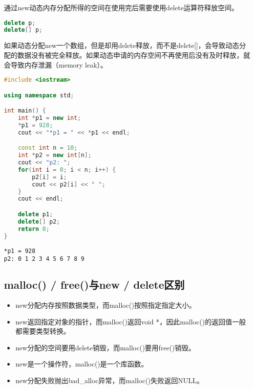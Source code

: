通过new动态内存分配所得的空间在使用完后需要使用delete运算符释放空间。

\vspace{-0.5cm}

\begin{lstlisting}[language=C++]
delete p;
delete[] p;
\end{lstlisting}

如果动态分配new一个数组，但是却用delete释放，而不是delete[]，会导致动态分配的数据没有被完全释放。如果动态申请的内存空间不再使用后没有及时释放，就会导致内存泄漏（memory leak）。 \\


\begin{lstlisting}[language=C++]
#include <iostream>

using namespace std;

int main() {
    int *p1 = new int;
    *p1 = 928;
    cout << "*p1 = " << *p1 << endl;

    const int n = 10;
    int *p2 = new int[n];
    cout << "p2: ";
    for(int i = 0; i < n; i++) {
        p2[i] = i;
        cout << p2[i] << " ";
    }
    cout << endl;

    delete p1;
    delete[] p2;
    return 0;
}
\end{lstlisting}

\begin{tcolorbox}
	\begin{verbatim}
*p1 = 928
p2: 0 1 2 3 4 5 6 7 8 9
	\end{verbatim}
\end{tcolorbox}

\subsection{malloc() / free()与new / delete区别}

\begin{itemize}
	\item new分配内存按照数据类型，而malloc()按照指定指定大小。

	\item new返回指定对象的指针，而malloc()返回void *，因此malloc()的返回值一般都需要类型转换。

	\item new分配的空间要用delete销毁，而malloc()要用free()销毁。

	\item new是一个操作符，malloc()是一个库函数。

	\item new分配失败抛出bad\_alloc异常，而malloc()失败返回NULL。
\end{itemize}

